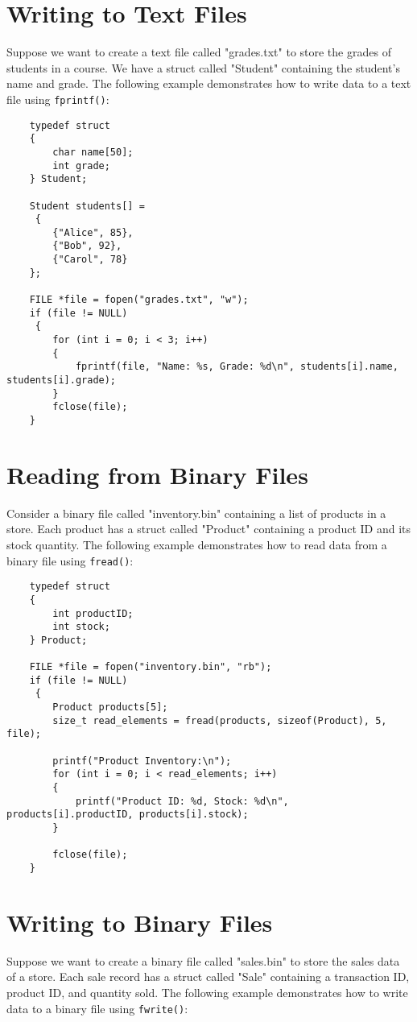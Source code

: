 \section{Writing to Text Files}
Suppose we want to create a text file called "grades.txt" to store the grades of students in a course. We have a struct called "Student" containing the student's name and grade. The following example demonstrates how to write data to a text file using {\tt fprintf()}:

\begin{verbatim}
	typedef struct 
	{
		char name[50];
		int grade;
	} Student;
	
	Student students[] =
	 {
		{"Alice", 85},
		{"Bob", 92},
		{"Carol", 78}
	};
	
	FILE *file = fopen("grades.txt", "w");
	if (file != NULL)
	 {
		for (int i = 0; i < 3; i++) 
		{
			fprintf(file, "Name: %s, Grade: %d\n", students[i].name, students[i].grade);
		}
		fclose(file);
	}
\end{verbatim}

\section{Reading from Binary Files}
Consider a binary file called "inventory.bin" containing a list of products in a store. 
Each product has a struct called "Product" containing a product ID and its stock quantity.
 The following example demonstrates how to read data from a binary file using {\tt fread()}:

\begin{verbatim}
	typedef struct 
	{
		int productID;
		int stock;
	} Product;
	
	FILE *file = fopen("inventory.bin", "rb");
	if (file != NULL)
	 {
		Product products[5];
		size_t read_elements = fread(products, sizeof(Product), 5, file);
		
		printf("Product Inventory:\n");
		for (int i = 0; i < read_elements; i++)
		{
			printf("Product ID: %d, Stock: %d\n", products[i].productID, products[i].stock);
		}
		
		fclose(file);
	}
\end{verbatim}

\section{Writing to Binary Files}
Suppose we want to create a binary file called "sales.bin" to store the sales data of a store. Each sale record has a struct called "Sale" containing a transaction ID, product ID, and quantity sold. The following example demonstrates how to write data to a binary file using {\tt fwrite()}:


